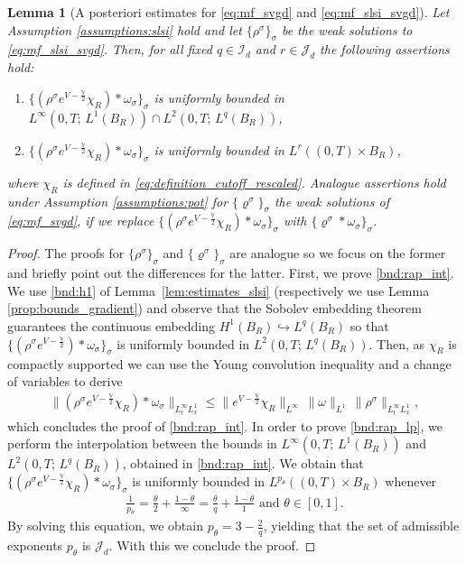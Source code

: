 \documentclass[reqno, 11pt]{amsart}
\numberwithin{equation}{section}
\newtheorem{lem}[thm]{Lemma}
\theoremstyle{definition}
\begin{document}
\begin{lem}[A posteriori estimates for \eqref{eq:mf_svgd} and \eqref{eq:mf_slsi_svgd}]
    \label{lem:ref_a_priori_est} Let Assumption \ref{assumptions:slsi} hold and let $\{\rho^\sigma\}_\sigma$ be the weak solutions to \eqref{eq:mf_slsi_svgd}. Then, for all fixed $q\in\mathcal{I}_d$ and $r\in\mathcal{J}_d$ the following assertions hold:
    \begin{enumerate}[label=(AP\arabic*)]
        \item \label{bnd:rap_int} $\{(\rho^\sigma e^{V-\frac{\mathbb{V}}{2}}\chi_R)\ast\omega_\sigma\}_\sigma$ is uniformly bounded in $L^\infty(0,T;\, L^1(B_R))\cap L^2(0,T;\, L^q(B_R))$,
        \item \label{bnd:rap_lp} $\{(\rho^\sigma e^{V-\frac{\mathbb{V}}{2}}\chi_R)\ast\omega_\sigma\}_\sigma$ is uniformly bounded in $L^r((0,T)\times B_R)$,
    \end{enumerate}
    where $\chi_R$ is defined in \eqref{eq:definition_cutoff_rescaled}. Analogue assertions hold under Assumption \ref{assumptions:pot} for $\{\varrho^\sigma\}_\sigma$ the weak solutions of \eqref{eq:mf_svgd}, if we replace $\{(\rho^\sigma e^{V-\frac{\mathbb{V}}{2}}\chi_R)\ast\omega_\sigma\}_\sigma$ with $\{\varrho^\sigma\ast\omega_\sigma\}_\sigma$.
\end{lem}
\begin{proof}
    The proofs for $\{\rho^\sigma\}_\sigma$ and $\{\varrho^\sigma\}_\sigma$ are analogue so we focus on the former and briefly point out the differences for the latter. First, we prove \ref{bnd:rap_int}. We use \ref{bnd:h1} of Lemma~\ref{lem:estimates_slsi} (respectively we use Lemma \ref{prop:bounds_gradient}) and observe that the Sobolev embedding theorem guarantees the continuous embedding $H^1(B_R)\hookrightarrow L^q(B_R)$ so that $\{(\rho^\sigma e^{V-\frac{\mathbb{V}}{2}})\ast\omega_\sigma\}_\sigma$ is uniformly bounded in $L^2(0,T;\, L^q(B_R))$. Then, as $\chi_R$ is compactly supported we can use the Young convolution inequality and a change of variables to derive
    \begin{align*}
        \|(\rho^\sigma e^{V-\frac{\mathbb{V}}{2}}\chi_R)\ast\omega_\sigma\|_{L_t^\infty L_x^1}
        \leq \|e^{V-\frac{\mathbb{V}}{2}}\chi_R\|_{L^\infty}\,\|\omega\|_{L^1}\,
        \|\rho^\sigma\|_{L_t^\infty L_x^1},
    \end{align*}
    which concludes the proof of \ref{bnd:rap_int}. In order to prove \ref{bnd:rap_lp}, we perform the interpolation between the bounds in $L^\infty(0,T;\, L^1(B_R))$ and $ L^2(0,T;\, L^q(B_R))$, obtained in \ref{bnd:rap_int}. We obtain that $\{(\rho^\sigma e^{V-\frac{\mathbb{V}}{2}}\chi_R)\ast\omega_\sigma\}_\sigma$ is uniformly bounded in $L^{p_\theta}((0,T)\times B_R)$ whenever
    \begin{align*}
        \frac{1}{p_\theta}
        =\frac{\theta}{2}+\frac{1-\theta}{\infty}
        =\frac{\theta}{q}+\frac{1-\theta}{1}
        \text{ and }\theta\in [0,1].
    \end{align*}
    By solving this equation, we obtain $p_{\theta}= 3-\frac{2}{q}$, yielding that the set of admissible exponents $p_\theta$ is $\mathcal{J}_d$. With this we conclude the proof.
\end{proof}
\end{document}
